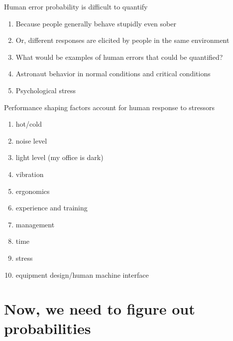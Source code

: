 \documentclass[aspectratio=1610,pdftex,dvipsnames,compress,xcolor={dvipsnames}]{beamer}
\begin{document}
\addtocounter{framenumber}{-1}
\begin{frame}{Human error probability is difficult to quantify}
    \begin{enumerate}[series=outerlist,topsep=0pt,itemsep=21pt,leftmargin=*,label=(\arabic*)]
        \item[]Because people generally behave stupidly even sober
        \item[]Or, different responses are elicited by people in the same environment
        \item[]What would be examples of human errors that could be quantified?
        \item[]Astronaut behavior in normal conditions and critical conditions
        \item[]Psychological stress
    \end{enumerate}
\end{frame}


\begin{frame}{Performance shaping factors account for human response to stressors}
    \begin{enumerate}[series=outerlist,topsep=0pt,itemsep=3pt,leftmargin=*,label=(\arabic*)]
        \item[]hot/cold  
        \item[]noise level   
        \item[]light level (my office is dark)  
        \item[]vibration  
        \item[]ergonomics
        \item[]experience and training
        \item[]management
        \item[]time
        \item[]stress
        \item[]equipment design/human machine interface
    \end{enumerate}
\end{frame}


\section{Now, we need to figure out probabilities}
\end{document}

